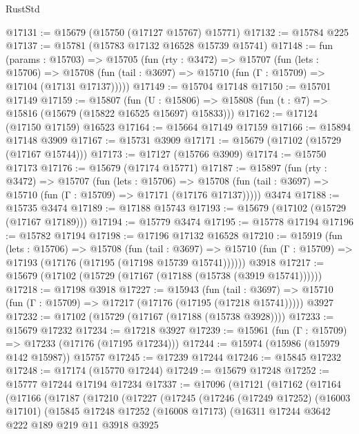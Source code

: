 \begin{lexlean}{RustStd}
\begin{coremodule}
@17131 := @15679 (@15750 (@17127 @15767) @15771)
@17132 := @15784 @225
@17137 := @15781 (@15783 @17132 @16528 @15739 @15741)
@17148 := fun (params : @15703) =>
  @15705
    (fun (rty : @3472) =>
    @15707
      (fun (lets : @15706) =>
      @15708 (fun (tail : @3697) => @15710 (fun (Γ : @15709) => @17104 (@17131 @17137)))))
@17149 := @15704 @17148
@17150 := @15701 @17149
@17159 := @15807
    (fun (U : @15806) => @15808 (fun (t : @7) => @15816 (@15679 (@15822 @16525 @15697) @15833)))
@17162 := @17124 (@17150 @17159) @16523
@17164 := @15664 @17149 @17159
@17166 := @15894 @17148 @3909
@17167 := @15731 @3909
@17171 := @15679 (@17102 (@15729 (@17167 @15744)))
@17173 := @17127 (@15766 @3909)
@17174 := @15750 @17173
@17176 := @15679 (@17174 @15771)
@17187 := @15897
    (fun (rty : @3472) =>
    @15707
      (fun (lets : @15706) =>
      @15708 (fun (tail : @3697) => @15710 (fun (Γ : @15709) => @17171 (@17176 @17137)))))
    @3474
@17188 := @15735 @3474
@17189 := @17188 @15743
@17193 := @15679 (@17102 (@15729 (@17167 @17189)))
@17194 := @15779 @3474
@17195 := @15778 @17194
@17196 := @15782 @17194
@17198 := @17196 @17132 @16528
@17210 := @15919
    (fun (lets : @15706) =>
    @15708
      (fun (tail : @3697) =>
      @15710 (fun (Γ : @15709) => @17193 (@17176 (@17195 (@17198 @15739 @15741))))))
    @3918
@17217 := @15679 (@17102 (@15729 (@17167 (@17188 (@15738 (@3919 @15741))))))
@17218 := @17198 @3918
@17227 := @15943
    (fun (tail : @3697) => @15710 (fun (Γ : @15709) => @17217 (@17176 (@17195 (@17218 @15741)))))
    @3927
@17232 := @17102 (@15729 (@17167 (@17188 (@15738 @3928))))
@17233 := @15679 @17232
@17234 := @17218 @3927
@17239 := @15961 (fun (Γ : @15709) => @17233 (@17176 (@17195 @17234)))
@17244 := @15974 (@15986 (@15979 @142 @15987)) @15757
@17245 := @17239 @17244
@17246 := @15845 @17232
@17248 := @17174 (@15770 @17244)
@17249 := @15679 @17248
@17252 := @15777 @17244 @17194 @17234
@17337 := @17096
    (@17121
      (@17162
        (@17164
          (@17166
            (@17187
              (@17210
                (@17227
                  (@17245
                    (@17246
                      (@17249 @17252)
                      (@16003 @17101)
                      (@15845
                        @17248
                        @17252
                        (@16008 @17173)
                        (@16311
                          @17244
                          @3642
                          @222
                          @189
                          @219
                          @11
                          @3918
                          @3925

\end{coremodule}
\end{lexlean}
